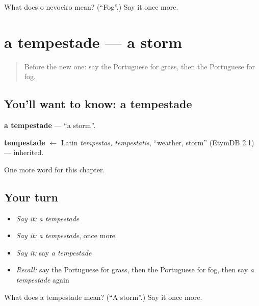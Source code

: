 \begin{tcolorbox}[breakable,colback=teal!4,colframe=teal!35!black,title={Before you move on}]
What does o nevoeiro mean? (\textquotedblleft{}Fog\textquotedblright{}.) Say it once more.
\end{tcolorbox}
\section[a tempestade]{a tempestade — a storm}

\label{lesson:PT-C116-tempestade}



\begin{quote}
Before the new one: say the Portuguese for grass, then the Portuguese for fog.
\end{quote}

\subsection*{You'll want to know: a tempestade}
\textbf{a tempestade} — \textquotedblleft{}a storm\textquotedblright{}.

\begin{cousinweb}
\textbf{tempestade} $\leftarrow$ Latin \emph{tempestas, tempestatis}, \textquotedblleft{}weather, storm\textquotedblright{} (EtymDB 2.1) — inherited.
\end{cousinweb}

\begin{grammarlens}[title={What you've built}]
One more word for this chapter.
\end{grammarlens}

\subsection*{Your turn}
\begin{itemize}
\raggedright
  \item \emph{Say it:} \emph{a tempestade}
  \item \emph{Say it:} \emph{a tempestade}, once more
  \item \emph{Say it:} say \emph{a tempestade}
  \item \emph{Recall:} say the Portuguese for grass, then the Portuguese for fog, then say \emph{a tempestade} again
\end{itemize}

\begin{tcolorbox}[breakable,colback=teal!4,colframe=teal!35!black,title={Before you move on}]
What does a tempestade mean? (\textquotedblleft{}A storm\textquotedblright{}.) Say it once more.
\end{tcolorbox}
